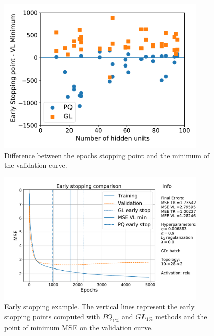 \documentclass[11pt,twoside]{article}
\begin{document}
\begin{enumerate}
  \begin{figure}[htbp]
    \centering
    \includegraphics[width=0.90\textwidth]{img/early_stop_point.pdf}
    \caption{Difference between the epochs stopping point and the minimum of the validation curve.}
    \label{fig:early_stop_point}
  \end{figure}


    \begin{figure}[htbp]
    \centering
    \includegraphics[width=0.90\textwidth]{img/learning_early_0.pdf}
    \caption{ Early stopping example. The vertical lines represent the early stopping points computed with $PQ_{1\%}$ and $GL_{1\%}$ methods and the point of minimum MSE on the validation curve.}

    \label{fig:learning_early}
  \end{figure}




\end{enumerate}
\end{document}
